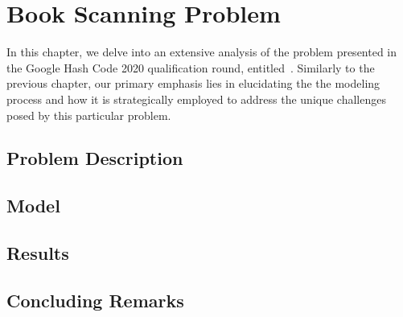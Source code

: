 \chapter{Book Scanning Problem}
\label{ch:book-scanning}


In this chapter, we delve into an extensive analysis of the problem presented in
the Google Hash Code 2020 qualification round,
entitled~. Similarly
to the previous chapter, our primary emphasis lies in elucidating the  the
modeling process and how it is strategically employed to address the unique
challenges posed by this particular problem.

\section{Problem Description}
\label{sec:bs-problem}


\section{Model}
\label{sec:bs-model}


\section{Results}
\label{sec:bs-results}


\section{Concluding Remarks}
\label{sec:bs-concluding-remarks}
